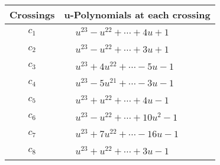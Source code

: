 \documentclass[1p]{elsarticle_modified}
\theoremstyle{definition}
\begin{document}
\begin{tabular}{m{50pt}|m{274pt}}
Crossings & \hspace{64pt}u-Polynomials at each crossing \\
\hline $$\begin{aligned}c_{1}\end{aligned}$$&$\begin{aligned}
&u^{23}- u^{22}+\cdots+4 u+1
\end{aligned}$\\
\hline $$\begin{aligned}c_{2}\end{aligned}$$&$\begin{aligned}
&u^{23}- u^{22}+\cdots+3 u+1
\end{aligned}$\\
\hline $$\begin{aligned}c_{3}\end{aligned}$$&$\begin{aligned}
&u^{23}+4 u^{22}+\cdots-5 u-1
\end{aligned}$\\
\hline $$\begin{aligned}c_{4}\end{aligned}$$&$\begin{aligned}
&u^{23}-5 u^{21}+\cdots-3 u-1
\end{aligned}$\\
\hline $$\begin{aligned}c_{5}\end{aligned}$$&$\begin{aligned}
&u^{23}+u^{22}+\cdots+4 u-1
\end{aligned}$\\
\hline $$\begin{aligned}c_{6}\end{aligned}$$&$\begin{aligned}
&u^{23}- u^{22}+\cdots+10 u^2-1
\end{aligned}$\\
\hline $$\begin{aligned}c_{7}\end{aligned}$$&$\begin{aligned}
&u^{23}+7 u^{22}+\cdots-16 u-1
\end{aligned}$\\
\hline $$\begin{aligned}c_{8}\end{aligned}$$&$\begin{aligned}
&u^{23}+u^{22}+\cdots+3 u-1
\end{aligned}$\\

\end{tabular}
\end{document}
